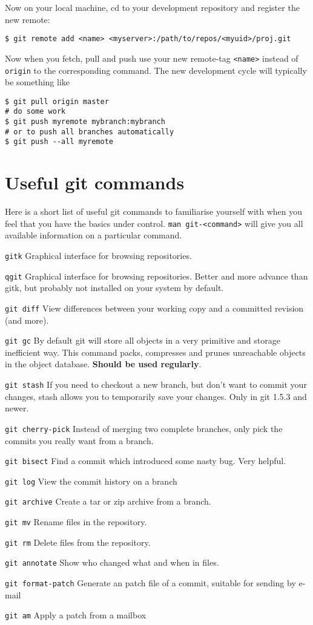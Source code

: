 \documentclass[a4paper,10pt]{article}
\begin{document}
Now on your local machine, cd to your development repository and register the 
new remote:
\begin{verbatim}
$ git remote add <name> <myserver>:/path/to/repos/<myuid>/proj.git
\end{verbatim}
Now when you fetch, pull and push use your new remote-tag {\tt <name>} instead 
of {\tt origin} to the corresponding command. The new development cycle will
typically be something like
\begin{verbatim}
$ git pull origin master
# do some work
$ git push myremote mybranch:mybranch
# or to push all branches automatically
$ git push --all myremote 
\end{verbatim}

\section{Useful git commands}
Here is a short list of useful git commands to familiarise yourself with when
you feel that you have the basics under control. {\tt man git-<command>} will
give you all available information on a particular command.
\begin{description}
\item{\tt gitk} Graphical interface for browsing repositories.
\item{\tt qgit} Graphical interface for browsing repositories. Better and more
advance than gitk, but probably not installed on your system by default.
\item{\tt git diff} View differences between your working copy and a committed
revision (and more).
\item{\tt git gc} By default git will store all objects in a very primitive
and storage inefficient way. This command packs, compresses and prunes
unreachable objects in the object database. {\bf Should be used regularly}.
\item{\tt git stash} If you need to checkout a new branch, but don't want to
commit your changes, stash allows you to temporarily save your changes. Only
in git 1.5.3 and newer.
\item{\tt git cherry-pick} Instead of merging two complete branches, only pick the
commits you really want from a branch.
\item{\tt git bisect} Find a commit which introduced some nasty bug. Very
helpful.
\item{\tt git log} View the commit history on a branch
\item{\tt git archive} Create a tar or zip archive from a branch.
\item{\tt git mv} Rename files in the repository.
\item{\tt git rm} Delete files from the repository.
\item{\tt git annotate} Show who changed what and when in files.
\item{\tt git format-patch} Generate an patch file of a commit, suitable for
sending by e-mail
\item{\tt git am} Apply a patch from a mailbox

\end{description}
\end{document}
